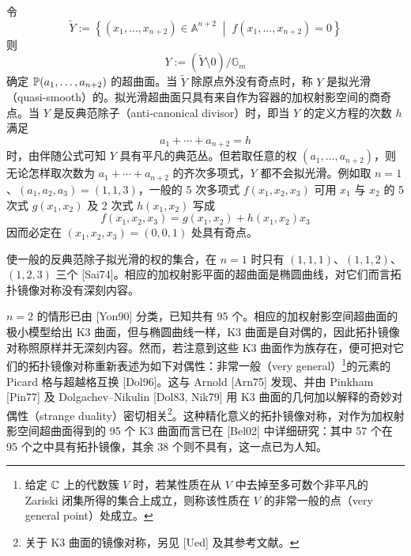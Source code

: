 令
\begin{equation}
  \tilde Y:=\left\{(x_1,\ldots,x_{n+2})\in\mathbb{A}^{n+2}\;\middle|\;f(x_1,\ldots,x_{n+2})=0\right\}
  \tag{9.22}
\end{equation}
则
\begin{equation}
  Y:=\left(\tilde Y\setminus 0\right)/\mathbb{G}_m
  \tag{9.23}
\end{equation}
确定 $\mathbb{P}(a_1,\ldots,a_{n+2})$ 的超曲面。当 $\tilde Y$ 除原点外没有奇点时，称 $Y$ 是拟光滑（quasi-smooth）的。拟光滑超曲面只具有来自作为容器的加权射影空间的商奇点。当 $Y$ 是反典范除子（anti-canonical divisor）时，即当 $Y$ 的定义方程的次数 $h$ 满足
\begin{equation}
  a_1+\cdots+a_{n+2}=h
  \tag{9.24}
\end{equation}
时，由伴随公式可知 $Y$ 具有平凡的典范丛。但若取任意的权 $(a_1,\ldots,a_{n+2})$，则无论怎样取次数为 $a_1+\cdots+a_{n+2}$ 的齐次多项式，$Y$ 都不会拟光滑。例如取 $n=1$、$(a_1,a_2,a_3)=(1,1,3)$，一般的 5 次多项式 $f(x_1,x_2,x_3)$ 可用 $x_1$ 与 $x_2$ 的 5 次式 $g(x_1,x_2)$ 及 2 次式 $h(x_1,x_2)$ 写成
\begin{equation}
  f(x_1,x_2,x_3)=g(x_1,x_2)+h(x_1,x_2)x_3
  \tag{9.25}
\end{equation}
因而必定在 $(x_1,x_2,x_3)=(0,0,1)$ 处具有奇点。

使一般的反典范除子拟光滑的权的集合，在 $n=1$ 时只有 $(1,1,1)$、$(1,1,2)$、$(1,2,3)$ 三个 [Sai74]。相应的加权射影平面的超曲面是椭圆曲线，对它们而言拓扑镜像对称没有深刻内容。

$n=2$ 的情形已由 [Yon90] 分类，已知共有 95 个。相应的加权射影空间超曲面的极小模型给出 K3 曲面，但与椭圆曲线一样，K3 曲面是自对偶的，因此拓扑镜像对称照原样并无深刻内容。然而，若注意到这些 K3 曲面作为族存在，便可把对它们的拓扑镜像对称重新表述为如下对偶性：非常一般（very general）\footnote{给定 $\mathbb{C}$ 上的代数簇 $V$ 时，若某性质在从 $V$ 中去掉至多可数个非平凡的 Zariski 闭集所得的集合上成立，则称该性质在 $V$ 的非常一般的点（very general point）处成立。}的元素的 Picard 格与超越格互换 [Dol96]。这与 Arnold [Arn75] 发现、并由 Pinkham [Pin77] 及 Dolgachev--Nikulin [Dol83, Nik79] 用 K3 曲面的几何加以解释的奇妙对偶性（strange duality）密切相关\footnote{关于 K3 曲面的镜像对称，另见 [Ued] 及其参考文献。}。这种精化意义的拓扑镜像对称，对作为加权射影空间超曲面得到的 95 个 K3 曲面而言已在 [Bel02] 中详细研究：其中 57 个在 95 个之中具有拓扑镜像，其余 38 个则不具有，这一点已为人知。

